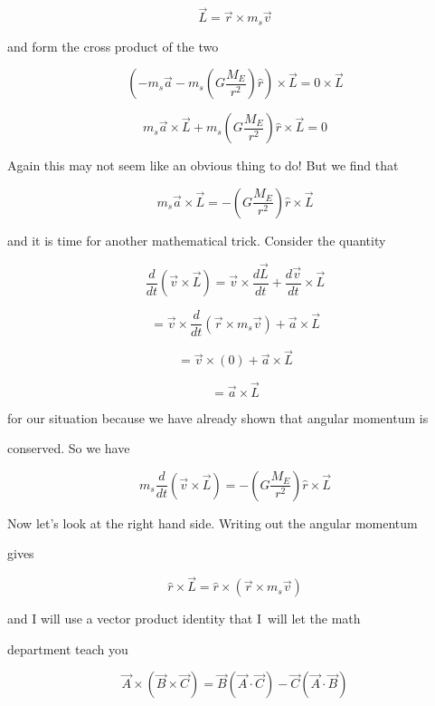 $$\overrightarrow{L}=\overrightarrow{r}\times m_{s}\overrightarrow{v}$$

and form the cross product of the two%

$$\left( -m_{s}\overrightarrow{a}-m_{s}\left( G\frac{M_{E}}{r^{2}}\right) \hat{r}\right) \times \overrightarrow{L}=0\times \overrightarrow{L}$$

$$m_{s}\overrightarrow{a}\times \overrightarrow{L}+m_{s}\left( G\frac{M_{E}}{r^{2}}\right) \hat{r}\times \overrightarrow{L}=0 $$

Again this may not seem like an obvious thing to do! But we find that 

$$m_{s}\overrightarrow{a}\times \overrightarrow{L}=-\left( G\frac{M_{E}}{r^{2}}\right) \hat{r}\times \overrightarrow{L}$$

and it is time for another mathematical trick. Consider the quantity%

$$\frac{d}{dt}\left( \overrightarrow{v}\times \overrightarrow{L}\right) =\overrightarrow{v}\times \frac{d\overrightarrow{L}}{dt}+\frac{d\overrightarrow{v}}{dt}\times \overrightarrow{L}$$

$$=\overrightarrow{v}\times \frac{d}{dt}\left( \overrightarrow{r}\times m_{s}\overrightarrow{v}\right) +\overrightarrow{a}\times \overrightarrow{L}$$

$$=\overrightarrow{v}\times \left( 0\right) +\overrightarrow{a}\times \overrightarrow{L}$$

$$=\overrightarrow{a}\times \overrightarrow{L}$$

for our situation because we have already shown that angular momentum is

conserved. So we have 

$$m_{s}\frac{d}{dt}\left( \overrightarrow{v}\times \overrightarrow{L}\right)=-\left( G\frac{M_{E}}{r^{2}}\right) \hat{r}\times \overrightarrow{L}$$


Now let's look at the right hand side. Writing out the angular momentum

gives 

$$\hat{r}\times \overrightarrow{L}=\hat{r}\times \left( \overrightarrow{r}\times m_{s}\overrightarrow{v}\right) $$

and I will use a vector product identity that I\ will let the math

department teach you

$$\overrightarrow{A}\times \left( \overrightarrow{B}\times \overrightarrow{C}\right) =\overrightarrow{B}\left( \overrightarrow{A}\cdot \overrightarrow{C}\right) -\overrightarrow{C}\left( \overrightarrow{A}\cdot \overrightarrow{B}\right) $$

